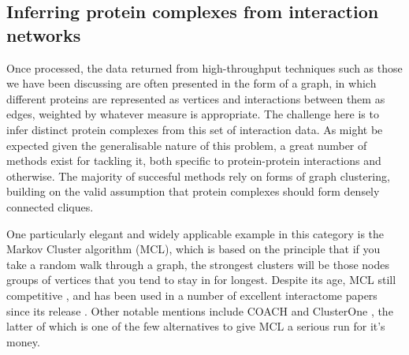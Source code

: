 \documentclass[a4paper,11pt,twoside,openright]{scrbook}
\begin{document}
\subsection{Inferring protein complexes from interaction networks}
Once processed, the data returned from high-throughput techniques such as those we have been discussing are often presented in the form of a graph, in which different proteins are represented as vertices and interactions between them as edges, weighted by whatever measure is appropriate. The challenge here is to infer distinct protein complexes from this set of interaction data. As might be expected given the generalisable nature of this problem, a great number of methods exist for tackling it, both specific to protein-protein interactions and otherwise. The majority of succesful methods rely on forms of graph clustering, building on the valid assumption that protein complexes should form densely connected cliques.

One particularly elegant and widely applicable example in this category is the Markov Cluster algorithm \cite{VanDongen2000} (MCL), which is based on the principle that if you take a random walk through a graph, the strongest clusters will be those nodes groups of vertices that you tend to stay in for longest. Despite its age, MCL still competitive \cite{Li2010}, and has been used in a number of excellent interactome papers since its release \cite{Krogan2006,Wan2015}. Other notable mentions include COACH and ClusterOne \cite{Wu2009,Nepusz2012}, the latter of which is one of the few alternatives to give MCL a serious run for it's money.

\end{document}
